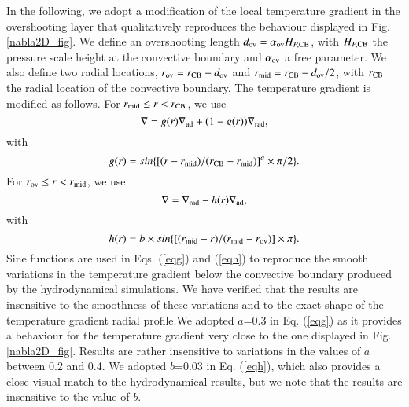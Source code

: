 \documentclass[traditabstract]{aa}
\newcommand{\3}{\ss}
\begin{document}
{In the following, we adopt a modification of the local temperature gradient in the overshooting layer that qualitatively reproduces the behaviour displayed in Fig. \ref{nabla2D_fig}.
We define an overshooting length $d_{\rm ov} = \alpha_{\rm ov} H_{P,{\rm CB}}$, with $H_{P,{\rm CB}}$ the pressure scale height at the convective boundary and $\alpha_{\rm ov}$ a free parameter. We also define 
two radial locations, $r_{\rm ov} = r_{\rm CB} - d_{\rm ov}$ and $r_{\rm mid} = r_{\rm CB} - d_{\rm ov}/2$,
with $ r_{\rm CB}$ the radial location of the convective boundary. The temperature gradient is modified as follows. 
For  $r_{\rm mid} \le r < r_{\rm CB}$, we use
\begin{equation}
\nabla = g(r) \nabla_{\rm ad} + (1-g(r))\nabla_{\rm rad},    \label{eqnabla}
\end{equation}
with
\begin{equation}
g(r)=sin\{ [(r - r_{\rm mid})/(r_{\rm CB} - r_{\rm mid})]^a \times \pi/2\}. \label{eqg}
\end{equation}
For $r_{\rm ov} \le r < r_{\rm mid}$, we use 
\begin{equation}
\nabla = \nabla_{\rm rad} - h(r) \nabla_{\rm ad},
\end{equation}
with
\begin{equation}
h(r)=b \times sin\{ [(r_{\rm mid} -r)/(r_{\rm mid} - r_{\rm ov}) ] \times \pi \}.    \label{eqh}
\end{equation} 
Sine functions are used in Eqs. (\ref{eqg}) and (\ref{eqh}) to reproduce the smooth variations in the temperature gradient below the convective boundary produced by the hydrodynamical simulations.
We have verified that the results are insensitive to the smoothness of these variations and to the exact shape of the temperature gradient radial profile.We adopted $a$=0.3 in Eq. (\ref{eqg}) as it provides a behaviour for the temperature gradient very close to the one displayed in Fig. \ref{nabla2D_fig}. Results are rather insensitive to  variations in the values of $a$  between 0.2 and 0.4. We adopted $b$=0.03 in Eq. (\ref{eqh}), which also provides a close visual match to the hydrodynamical results, but we note that the results are  insensitive to the value of $b$.

}
\end{document}
